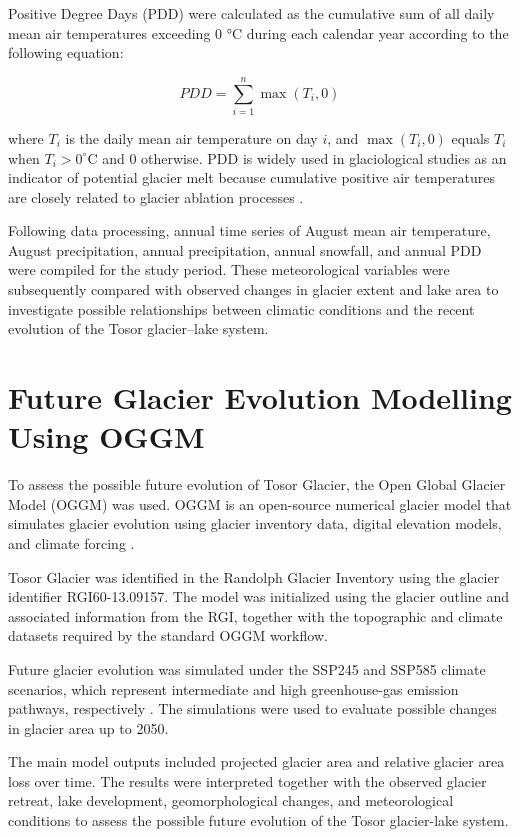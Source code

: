 \documentclass[12pt,a4paper]{report}
\begin{document}
Positive Degree Days (PDD) were calculated as the cumulative sum of all daily mean air temperatures exceeding 0 °C during each calendar year according to the following equation:

\begin{equation}
PDD=\sum_{i=1}^{n}\max(T_i,0)
\label{eq:pdd}
\end{equation}

where $T_i$ is the daily mean air temperature on day $i$, and $\max(T_i,0)$ equals $T_i$ when $T_i>0^\circ$C and 0 otherwise. PDD is widely used in glaciological studies as an indicator of potential glacier melt because cumulative positive air temperatures are closely related to glacier ablation processes \cite{Braithwaite1984, Hock2003}.

Following data processing, annual time series of August mean air temperature, August precipitation, annual precipitation, annual snowfall, and annual PDD were compiled for the study period. These meteorological variables were subsequently compared with observed changes in glacier extent and lake area to investigate possible relationships between climatic conditions and the recent evolution of the Tosor glacier–lake system.

\section{Future Glacier Evolution Modelling Using OGGM}

To assess the possible future evolution of Tosor Glacier, the Open Global Glacier Model (OGGM) was used. OGGM is an open-source numerical glacier model that simulates glacier evolution using glacier inventory data, digital elevation models, and climate forcing \cite{maussion2018,rounce2023}.

Tosor Glacier was identified in the Randolph Glacier Inventory using the glacier identifier RGI60-13.09157. The model was initialized using the glacier outline and associated information from the RGI, together with the topographic and climate datasets required by the standard OGGM workflow.

Future glacier evolution was simulated under the SSP245 and SSP585 climate scenarios, which represent intermediate and high greenhouse-gas emission pathways, respectively \cite{rounce2023}. The simulations were used to evaluate possible changes in glacier area up to 2050.

The main model outputs included projected glacier area and relative glacier area loss over time. The results were interpreted together with the observed glacier retreat, lake development, geomorphological changes, and meteorological conditions to assess the possible future evolution of the Tosor glacier-lake system.
\end{document}
